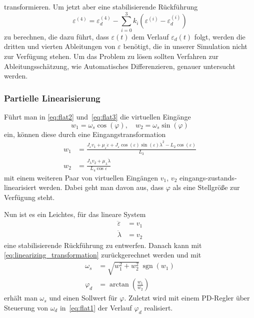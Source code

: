 \documentclass[times, 9pt,twocolumn]{article}
\DeclareMathOperator{\sgn}{\mathrm{sgn}}
\begin{document}
	transformieren.
	Um jetzt aber eine stabilisierende Rückführung
	\[
		\varepsilon^{(4)} = \varepsilon_d^{(4)} - \sum_{i=0}^3 k_i (\varepsilon^{(i)} - \varepsilon_d^{(i)})
	\]
	zu berechnen, die dazu führt, dass \(\varepsilon(t)\) dem Verlauf \(\varepsilon_d(t)\) folgt, werden die dritten und vierten Ableitungen von \(\varepsilon\) benötigt, die in unserer Simulation nicht zur Verfügung stehen.
	Um das Problem zu lösen sollten Verfahren zur Ableitungsschätzung, wie Automatisches Differenzieren, genauer untersucht werden.
	\subsubsection{Partielle Linearisierung}
	Führt man in \ref{eq:flat2} und~\ref{eq:flat3} die virtuellen Eingänge
	\[
		w_1 = \omega_s \cos(\varphi), \quad
		w_2 = \omega_s \sin(\varphi)
	\]
	ein, können diese durch eine Eingangstransformation
	\begin{subequations}
		\begin{align}
			w_1 &= \frac{J_\varepsilon v_1 + \mu_\varepsilon \dot \varepsilon + J_\varepsilon \cos(\varepsilon) \sin(\varepsilon)\dot{\lambda}^2-L_2 \cos(\varepsilon)}{L_3} \\
			w_2 &= \frac{J_\lambda v_2 + \mu_\lambda \dot \lambda}{L_4 \cos{\varepsilon}}
		\end{align}
		\label{eq:linearizing_transformation}
	\end{subequations}
	mit einem weiteren Paar von virtuellen Eingängen \(v_1\), \(v_2\) eingangs-zustands-linearisiert werden.
	Dabei geht man davon aus, dass \(\varphi\) als eine Stellgröße zur Verfügung steht.

	Nun ist es ein Leichtes, für das lineare System
	\begin{subequations}
		\begin{align}
			\ddot{\varepsilon} &= v_1\\
			\ddot{\lambda} &= v_2
		\end{align}
	\end{subequations}
	eine stabilisierende Rückführung zu entwerfen.
	Danach kann mit \ref{eq:linearizing_transformation} zurückgerechnet werden und mit
	\begin{subequations}
		\begin{align}
\omega_s &= \sqrt{w_1^2 + w_2^2}\ \sgn (w_1)\\
\varphi_d &= \arctan \left(\frac{w_1}{w_2}\right) 
		\end{align}
	\end{subequations}
	erhält man \(\omega_s\) und einen Sollwert für \(\varphi\).
	Zuletzt wird mit einem PD-Regler über Steuerung von \(\omega_d\) in~\ref{eq:flat1} der Verlauf \(\varphi_d\) realisiert.
	
\end{document}
